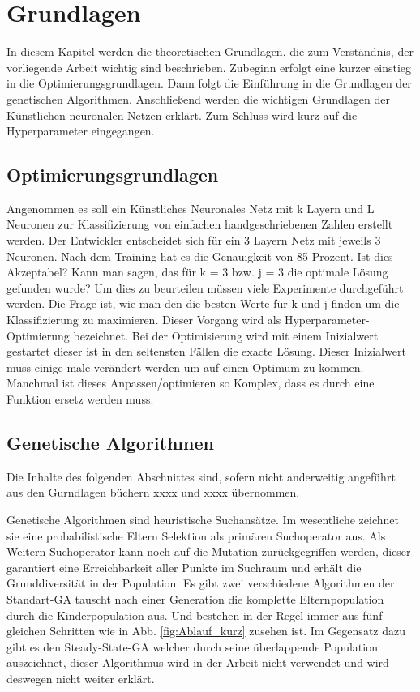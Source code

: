 \section{Grundlagen}
\label{sec:Grundlagen}
In diesem Kapitel werden die theoretischen Grundlagen, die zum Verständnis, der vorliegende Arbeit wichtig sind beschrieben. Zubeginn erfolgt eine kurzer einstieg in die Optimierungsgrundlagen. Dann folgt die Einführung in die Grundlagen der genetischen Algorithmen. Anschließend werden die wichtigen Grundlagen der Künstlichen neuronalen Netzen erklärt. Zum Schluss wird kurz auf die Hyperparameter eingegangen.

\subsection{Optimierungsgrundlagen}
Angenommen es soll ein Künstliches Neuronales Netz mit k Layern und L Neuronen zur Klassifizierung von einfachen handgeschriebenen Zahlen erstellt werden. Der Entwickler entscheidet sich für ein 3 Layern Netz mit jeweils 3 Neuronen. Nach dem Training hat es die Genauigkeit von 85 Prozent. Ist dies Akzeptabel? Kann man sagen, das für k = 3 bzw. j = 3 die optimale Lösung gefunden wurde? Um dies zu beurteilen müssen viele Experimente durchgeführt werden. Die Frage ist, wie man den die besten Werte für k und j finden um die Klassifizierung zu maximieren. Dieser Vorgang wird als Hyperparameter-Optimierung bezeichnet. Bei der Optimisierung wird mit einem Inizialwert gestartet dieser ist in den seltensten Fällen die exacte Lösung. Dieser Inizialwert muss einige male verändert werden um auf einen Optimum zu kommen. Manchmal ist dieses Anpassen/optimieren so Komplex, dass es durch eine Funktion ersetz werden muss.


\subsection{Genetische Algorithmen}

Die Inhalte des folgenden Abschnittes sind, sofern nicht anderweitig angeführt aus den Gurndlagen büchern xxxx und xxxx übernommen. 

Genetische Algorithmen sind heuristische Suchansätze. Im wesentliche zeichnet sie eine probabilistische Eltern Selektion als primären Suchoperator aus. Als Weitern Suchoperator kann noch auf die Mutation zurückgegriffen werden, dieser garantiert eine Erreichbarkeit aller Punkte im Suchraum und erhält die Grunddiversität in der Population. Es gibt zwei verschiedene Algorithmen der Standart-GA tauscht nach einer Generation die komplette Elternpopulation durch die Kinderpopulation aus. Und bestehen in der Regel immer aus fünf gleichen Schritten wie in Abb. \ref{fig:Ablauf_kurz} zusehen ist. Im Gegensatz dazu gibt es den Steady-State-GA welcher durch seine überlappende Population auszeichnet, dieser Algorithmus wird in der Arbeit nicht verwendet und wird deswegen nicht weiter erklärt. 

